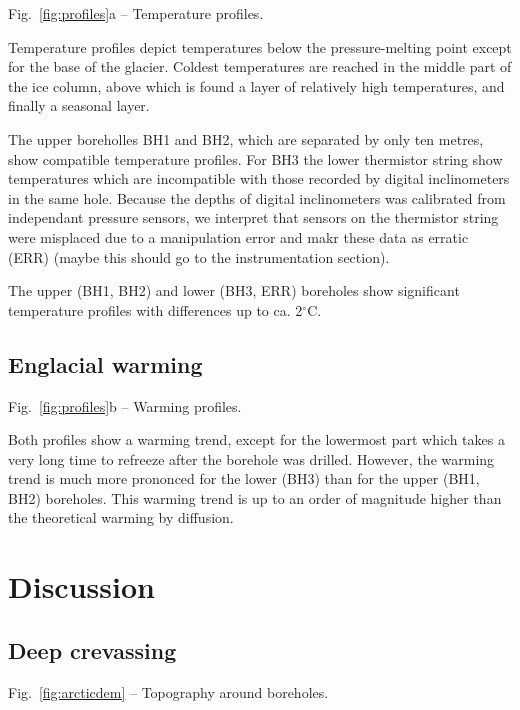\documentclass[utf8]{article}
\begin{document}
    Fig.~\ref{fig:profiles}a -- Temperature profiles.

    Temperature profiles depict temperatures below the pressure-melting point
    except for the base of the glacier. Coldest temperatures are reached in the
    middle part of the ice column, above which is found a layer of relatively
    high temperatures, and finally a seasonal layer.

    The upper boreholles BH1 and BH2, which are separated by only ten metres,
    show compatible temperature profiles. For BH3 the lower thermistor string
    show temperatures which are incompatible with those recorded by digital
    inclinometers in the same hole. Because the depths of digital inclinometers
    was calibrated from independant pressure sensors, we interpret that sensors
    on the thermistor string were misplaced due to a manipulation error and
    makr these data as erratic (ERR) (maybe this should go to the
    instrumentation section).

    The upper (BH1, BH2) and lower (BH3, ERR) boreholes show significant
    temperature profiles with differences up to ca. 2$^\circ$C.

\subsection{Englacial warming}

    Fig.~\ref{fig:profiles}b -- Warming profiles.

    Both profiles show a warming trend, except for the lowermost part which
    takes a very long time to refreeze after the borehole was drilled.
    However, the warming trend is much more prononced for the lower (BH3) than
    for the upper (BH1, BH2) boreholes. This warming trend is up to an order of
    magnitude higher than the theoretical warming by diffusion.


\section{Discussion}

\subsection{Deep crevassing}

    Fig.~\ref{fig:arcticdem} -- Topography around boreholes.
\end{document}
